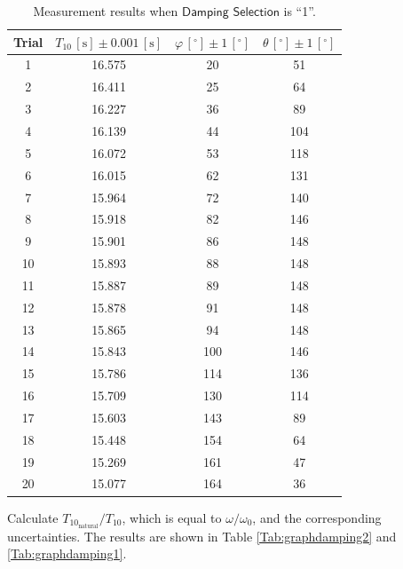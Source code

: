\documentclass[a4paper]{article}
\begin{document}
\begin{table}[htbp]
\centering
\begin{tabular}{cccc}
\toprule
Trial & $T_{10}\,[\text{s}]\pm0.001\,[\text{s}]$ & $\varphi\,[^\circ]\pm1\,[^\circ]$ & $\theta\,[^\circ]\pm 1\,[^\circ]$\\
\midrule
1&16.575	&20	&51\\
2&16.411	&25	&64\\
3&16.227	&36	&89\\
4&16.139	&44	&104\\
5&16.072	&53	&118\\
6&16.015	&62	&131\\
7&15.964	&72	&140\\
8&15.918	&82	&146\\
9&15.901	&86	&148\\
10&15.893	&88	&148\\
11&15.887	&89	&148\\
12&15.878	&91	&148\\
13&15.865	&94	&148\\
14&15.843	&100	&146\\
15&15.786	&114	&136\\
16&15.709	&130	&114\\
17&15.603	&143	&89\\
18&15.448	&154	&64\\
19&15.269	&161	&47\\
20&15.077	&164	&36\\
\bottomrule
\end{tabular}
\caption{Measurement results when $\textsf{Damping Selection}$ is ``1''.\label{Tab:pregraphdamping1}}
\end{table}



Calculate $T_{10_\text{natural}}/T_{10}$, which is equal to $\omega/\omega_0$, and the corresponding uncertainties. The results are shown in Table \ref{Tab:graphdamping2} and \ref{Tab:graphdamping1}.
\end{document}
